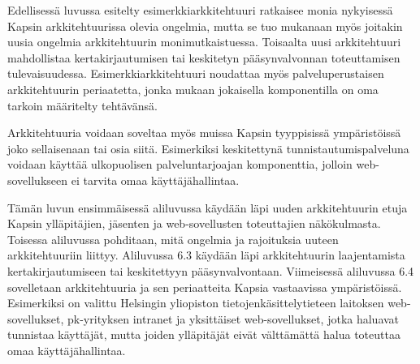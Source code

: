 Edellisessä luvussa esitelty esimerkkiarkkitehtuuri ratkaisee monia nykyisessä Kapsin arkkitehtuurissa olevia ongelmia, mutta se tuo mukanaan myös joitakin uusia ongelmia arkkitehtuurin monimutkaistuessa. Toisaalta uusi arkkitehtuuri mahdollistaa kertakirjautumisen tai keskitetyn pääsynvalvonnan toteuttamisen tulevaisuudessa. Esimerkkiarkkitehtuuri noudattaa myös palveluperustaisen arkkitehtuurin periaatetta, jonka mukaan jokaisella komponentilla on oma tarkoin määritelty tehtävänsä.

Arkkitehtuuria voidaan soveltaa myös muissa Kapsin tyyppisissä ympäristöissä joko sellaisenaan tai osia siitä. Esimerkiksi keskitettynä tunnistautumispalveluna voidaan käyttää ulkopuolisen palveluntarjoajan komponenttia, jolloin web-sovellukseen ei tarvita omaa käyttäjähallintaa.

Tämän luvun ensimmäisessä aliluvussa käydään läpi uuden arkkitehtuurin etuja Kapsin ylläpitäjien, jäsenten ja web-sovellusten toteuttajien näkökulmasta. Toisessa aliluvussa pohditaan, mitä ongelmia ja rajoituksia uuteen arkkitehtuuriin liittyy. Aliluvussa 6.3 käydään läpi arkkitehtuurin laajentamista kertakirjautumiseen tai keskitettyyn pääsynvalvontaan. Viimeisessä aliluvussa 6.4 sovelletaan arkkitehtuuria ja sen periaatteita Kapsia vastaavissa ympäristöissä. Esimerkiksi on valittu Helsingin yliopiston tietojenkäsittelytieteen laitoksen web-sovellukset, pk-yrityksen intranet ja yksittäiset web-sovellukset, jotka haluavat tunnistaa käyttäjät, mutta joiden ylläpitäjät eivät välttämättä halua toteuttaa omaa käyttäjähallintaa.